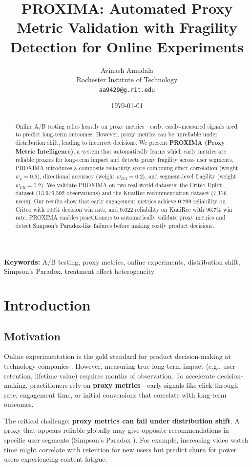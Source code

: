 \documentclass[11pt,twocolumn]{article}
\title{\textbf{PROXIMA: Automated Proxy Metric Validation with Fragility Detection for Online Experiments}}
\author{
    Avinash Amudala \\
    Rochester Institute of Technology \\
    \texttt{aa9429@g.rit.edu}
}
\date{\today}
\begin{document}
\maketitle

\begin{abstract}
Online A/B testing relies heavily on proxy metrics—early, easily-measured signals used to predict long-term outcomes. However, proxy metrics can be unreliable under distribution shift, leading to incorrect decisions. We present \textbf{PROXIMA (Proxy Metric Intelligence)}, a system that automatically learns which early metrics are reliable proxies for long-term impact and detects proxy fragility across user segments. PROXIMA introduces a composite reliability score combining effect correlation (weight $w_\rho=0.6$), directional accuracy (weight $w_{DA}=0.2$), and segment-level fragility (weight $w_{FR}=0.2$). We validate PROXIMA on two real-world datasets: the Criteo Uplift dataset (13,979,592 observations) and the KuaiRec recommendation dataset (7,176 users). Our results show that early engagement metrics achieve 0.799 reliability on Criteo with 100\% decision win rate, and 0.622 reliability on KuaiRec with 96.7\% win rate. PROXIMA enables practitioners to automatically validate proxy metrics and detect Simpson's Paradox-like failures before making costly product decisions.
\end{abstract}

\textbf{Keywords:} A/B testing, proxy metrics, online experiments, distribution shift, Simpson's Paradox, treatment effect heterogeneity

\section{Introduction}

\subsection{Motivation}

Online experimentation is the gold standard for product decision-making at technology companies \cite{kohavi2009controlled}. However, measuring true long-term impact (e.g., user retention, lifetime value) requires months of observation. To accelerate decision-making, practitioners rely on \textbf{proxy metrics}—early signals like click-through rate, engagement time, or initial conversions that correlate with long-term outcomes.

The critical challenge: \textbf{proxy metrics can fail under distribution shift}. A proxy that appears reliable globally may give opposite recommendations in specific user segments (Simpson's Paradox \cite{simpson1951interpretation}). For example, increasing video watch time might correlate with retention for new users but predict churn for power users experiencing content fatigue.
\end{document}
